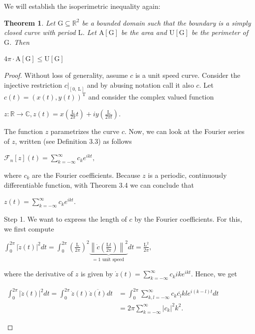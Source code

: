 \documentclass[a4paper]{book}
\newtheorem{theorem}{Theorem}%
\numberwithin{theorem}{section}%
\begin{document}
We will establish the isoperimetric inequality again:
\begin{theorem}
    Let $\mathrm{G}\subseteq\mathbb{R}^{2}$ be a bounded domain such that the boundary is a simply closed curve with period $\mathrm{L}$. Let $\mathrm{A}[\mathrm{G}]$ be the area and $\mathrm{U}[\mathrm{G}]$ be the perimeter of $\mathrm{G}$. Then
    \begin{center}
        $4\pi\cdot\mathrm{A}[\mathrm{G}]\leq\mathrm{U}[\mathrm{G}]$
    \end{center}
\end{theorem}
\begin{proof}
    Without loss of generality, assume $c$ is a unit speed curve. Consider the injective restriction $\left.c\right|_{[0, \mathrm{~L}]}$ and by abusing notation call it also $c$. Let $c(t)=(x(t), y(t))^{\mathrm{T}}$ and consider the complex valued function
    \begin{center}
        $\displaystyle z:\mathbb{R} \rightarrow \mathbb{C}, z(t)=x\left(\frac{\mathrm{L}}{2 \pi} t\right)+i y\left(\frac{\mathrm{L}}{2 \pi t}\right).$
    \end{center}

    The function $z$ parametrizes the curve $c$. Now, we can look at the Fourier series of $z$, written (see Definition 3.3) as follows
    \begin{center}
        $\displaystyle \mathscr{F}_n[z](t)=\sum_{k=-\infty}^{\infty}c_k e^{i k t},$
    \end{center}

    where $c_k$ are the Fourier coefficients. Because $z$ is a periodic, continuously differentiable function, with Theorem 3.4 we can conclude that
    \begin{center}
        $\displaystyle z(t)=\sum_{k=-\infty}^{\infty} c_k e^{i k t}.$
    \end{center}
    
    Step 1. We want to express the length of $c$ by the Fourier coefficients. For this, we first compute
    \begin{center}
        $\displaystyle \int_0^{2 \pi}|\dot{z}(t)|^2 d t=\int_0^{2 \pi}\left(\frac{\mathrm{L}}{2 \pi}\right)^2 \underbrace{\left\|\dot{c}\left(\frac{\mathrm{L} t}{2 \pi}\right)\right\|^2}_{=1 \text { unit speed }} d t=\frac{\mathrm{L}^2}{2 \pi},$
    \end{center}

    where the derivative of $z$ is given by $\dot{z}(t)=\sum_{k=-\infty}^{\infty} c_k i k e^{i k t}$. Hence, we get
    \begin{center}
        $\displaystyle \begin{aligned}\int_0^{2 \pi}|\dot{z}(t)|^2 d t=\int_0^{2 \pi} \dot{z}(t) \overline{\dot{z}(t)} d t & =\int_0^{2 \pi} \sum_{k,l=-\infty}^{\infty} c_k\overline{c_l}kle^{i(k-l)t}dt\\&=2\pi \sum_{k=-\infty}^{\infty}\left|c_k\right|^2 k^2.\end{aligned}$
    \end{center}


\end{proof}
\end{document}
